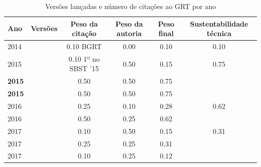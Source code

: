 \begin{table}[H]
\caption{Versões lançadas e número de citações ao GRT por ano}
\centering
\begin{tabular}{| l | c | c | c | c | c |}
  \hline
  Ano & Versões & Peso da citação & Peso da autoria & Peso final & Sustentabilidade técnica \\
  \hline
            2014
          &
          
          &
          0.10
            {\tiny BGRT}
          &
          0.00
          &
          0.10
          &
            {\color{red} 0.10}
          \\
\hline
            2015
          &
          
          &
          0.10
            {\tiny 1º no SBST '15}
          &
          0.50
          &
          0.15
          &
            {\color{blue} 0.75}
          \\
            {\bf 2015}
          &
          
          &
          0.50
          &
          0.50
          &
          0.75
          &
          \\
            {\bf 2015}
          &
          
          &
          0.50
          &
          0.50
          &
          0.75
          &
          \\
\hline
            2016
          &
          
          &
          0.25
          &
          0.10
          &
          0.28
          &
            {\color{blue} 0.62}
          \\
            2016
          &
          
          &
          0.50
          &
          0.25
          &
          0.62
          &
          \\
\hline
            2017
          &
          
          &
          0.10
          &
          0.50
          &
          0.15
          &
            {\color{red} 0.31}
          \\
            2017
          &
          
          &
          0.25
          &
          0.25
          &
          0.31
          &
          \\
            2017
          &
          
          &
          0.10
          &
          0.25
          &
          0.12
          &
          \\
\hline
\end{tabular}
\end{table}

